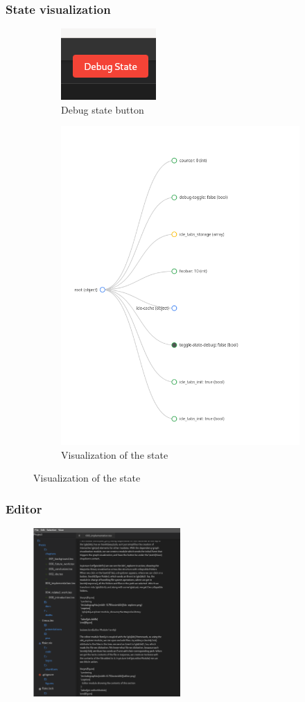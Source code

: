 \begin{frame}
  \frametitle{State visualization}
  \begin{figure}[H]
    \begin{subfigure}[h]{0.45\textwidth}
    \centering
    \includegraphics[height=0.25\textwidth]{./pics/debug-state-btn.png}
    \caption{
      Debug state button
    }
    \end{subfigure}
    \hfill
    \begin{subfigure}[h]{0.45\textwidth}
    \centering
    \includegraphics[height=0.5\textwidth]{./pics/debug-state.png}
    \caption{
      Visualization of the state
    }
    \end{subfigure}
  \end{figure}
\end{frame}

\begin{frame}
  \frametitle{Editor}
  \begin{figure}
    \centering
    \includegraphics[width=0.5\textwidth]{./pics/editor.png}
  \end{figure}
\end{frame}

